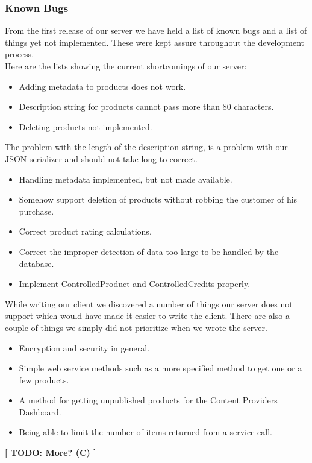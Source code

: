 \subsubsection{Known Bugs}
From the first release of our server we have held a list of known bugs and a list of things yet not implemented. These were kept assure throughout the development process. 
\\Here are the lists showing the current shortcomings of our server:
\begin{itemize}
\item Adding metadata to products does not work.
\item Description string for products cannot pass more than 80 characters.
\item Deleting products not implemented.
\end{itemize}
The problem with the length of the description string, is a problem with our JSON serializer and should not take long to correct.
\begin{itemize}
\item Handling metadata implemented, but not made available.
\item Somehow support deletion of products without robbing the customer of his purchase.
\item Correct product rating calculations.
\item Correct the improper detection of data too large to be handled by the database.
\item Implement ControlledProduct and ControlledCredits properly.
\end{itemize}
While writing our client we discovered a number of things our server does not support which would have made it easier to write the client. There are also a couple of things we simply did not prioritize when we wrote the server.
\begin{itemize}
\item Encryption and security in general.
\item Simple web service methods such as a more specified method to get one or a few products.
\item A method for getting unpublished products for the Content Providers Dashboard.
\item Being able to limit the number of items returned from a service call.
\end{itemize}
\textbf{[ TODO: More? (C) ]}